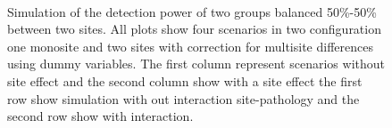 \documentclass[authoryear]{elsarticle}
\begin{document}
\begin{figure}[tbp]
     \\
     \caption{
     Simulation of the detection power of two groups balanced 50\%-50\% between two sites. All plots show four scenarios in two configuration one monosite and two sites with correction for multisite differences using dummy variables. The first column represent scenarios without site effect and the second column show with a site effect the first row show simulation with out interaction site-pathology and the second row show with interaction.
}
\label{fig_full_sim_site_effect}
 \end{figure}
 
\end{document}
